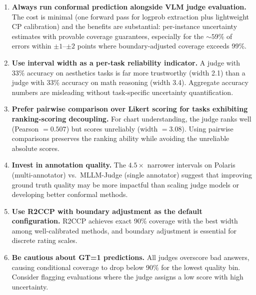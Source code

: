 \documentclass{article}
\begin{document}
\begin{enumerate}[leftmargin=*,itemsep=2pt,topsep=2pt]
\item \textbf{Always run conformal prediction alongside VLM judge evaluation.} The cost is minimal (one forward pass for logprob extraction plus lightweight CP calibration) and the benefits are substantial: per-instance uncertainty estimates with provable coverage guarantees, especially for the ${\sim}59\%$ of errors within $\pm 1$--$\pm 2$ points where boundary-adjusted coverage exceeds 99\%.

\item \textbf{Use interval width as a per-task reliability indicator.} A judge with 33\% accuracy on aesthetics tasks is far more trustworthy (width 2.1) than a judge with 33\% accuracy on math reasoning (width 3.4). Aggregate accuracy numbers are misleading without task-specific uncertainty quantification.

\item \textbf{Prefer pairwise comparison over Likert scoring for tasks exhibiting ranking-scoring decoupling.} For chart understanding, the judge ranks well (Pearson $= 0.507$) but scores unreliably (width $= 3.08$). Using pairwise comparisons preserves the ranking ability while avoiding the unreliable absolute scores.

\item \textbf{Invest in annotation quality.} The $4.5\times$ narrower intervals on Polaris (multi-annotator) vs.\ MLLM-Judge (single annotator) suggest that improving ground truth quality may be more impactful than scaling judge models or developing better conformal methods.

\item \textbf{Use R2CCP with boundary adjustment as the default configuration.} R2CCP achieves exact 90\% coverage with the best width among well-calibrated methods, and boundary adjustment is essential for discrete rating scales.

\item \textbf{Be cautious about GT=1 predictions.} All judges overscore bad answers, causing conditional coverage to drop below 90\% for the lowest quality bin. Consider flagging evaluations where the judge assigns a low score with high uncertainty.
\end{enumerate}
\end{document}
